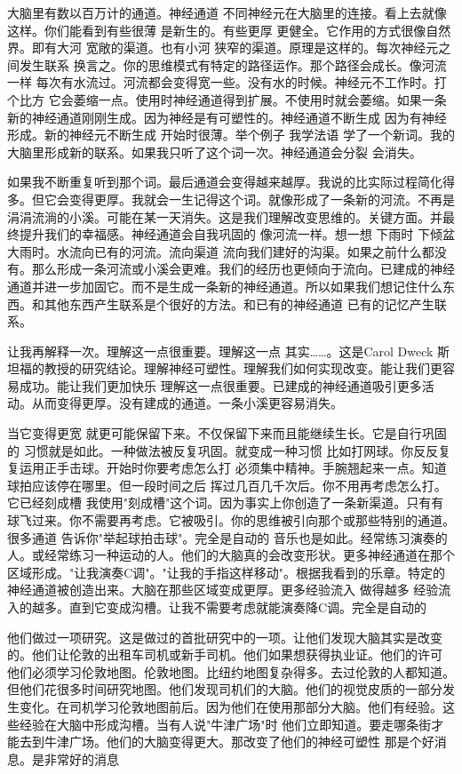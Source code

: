 大脑里有数以百万计的通道。神经通道 不同神经元在大脑里的连接。看上去就像这样。你们能看到有些很薄 是新生的。有些更厚 更健全。它作用的方式很像自然界。即有大河 宽敞的渠道。也有小河 狭窄的渠道。原理是这样的。每次神经元之间发生联系 换言之。你的思维模式有特定的路径运作。那个路径会成长。像河流一样 每次有水流过。河流都会变得宽一些。没有水的时候。神经元不工作时。打个比方 它会萎缩一点。使用时神经通道得到扩展。不使用时就会萎缩。如果一条新的神经通道刚刚生成。因为神经是有可塑性的。神经通道不断生成 因为有神经形成。新的神经元不断生成 开始时很薄。举个例子 我学法语 学了一个新词。我的大脑里形成新的联系。如果我只听了这个词一次。神经通道会分裂 会消失。 

如果我不断重复听到那个词。最后通道会变得越来越厚。我说的比实际过程简化得多。但它会变得更厚。我就会一生记得这个词。就像形成了一条新的河流。不再是涓涓流淌的小溪。可能在某一天消失。这是我们理解改变思维的。关键方面。并最终提升我们的幸福感。神经通道会自我巩固的 像河流一样。想一想 下雨时 下倾盆大雨时。水流向已有的河流。流向渠道 流向我们建好的沟渠。如果之前什么都没有。那么形成一条河流或小溪会更难。我们的经历也更倾向于流向。已建成的神经通道并进一步加固它。而不是生成一条新的神经通道。所以如果我们想记住什么东西。和其他东西产生联系是个很好的方法。和已有的神经通道 已有的记忆产生联系。 

让我再解释一次。理解这一点很重要。理解这一点 其实……。这是Carol Dweck 斯坦福的教授的研究结论。理解神经可塑性。理解我们如何实现改变。能让我们更容易成功。能让我们更加快乐 理解这一点很重要。已建成的神经通道吸引更多活动。从而变得更厚。没有建成的通道。一条小溪更容易消失。 

当它变得更宽 就更可能保留下来。不仅保留下来而且能继续生长。它是自行巩固的 习惯就是如此。一种做法被反复巩固。就变成一种习惯 比如打网球。你反反复复运用正手击球。开始时你要考虑怎么打 必须集中精神。手腕翘起来一点。知道球拍应该停在哪里。但一段时间之后 挥过几百几千次后。你不用再考虑怎么打。它已经刻成槽 我使用"刻成槽"这个词。因为事实上你创造了一条新渠道。只有有球飞过来。你不需要再考虑。它被吸引。你的思维被引向那个或那些特别的通道。很多通道 告诉你"举起球拍击球"。完全是自动的 音乐也是如此。经常练习演奏的人。或经常练习一种运动的人。他们的大脑真的会改变形状。更多神经通道在那个区域形成。"让我演奏C调"。"让我的手指这样移动"。根据我看到的乐章。特定的神经通道被创造出来。大脑在那些区域变成更厚。更多经验流入 做得越多 经验流入的越多。直到它变成沟槽。让我不需要考虑就能演奏降C调。完全是自动的 

他们做过一项研究。这是做过的首批研究中的一项。让他们发现大脑其实是改变的。他们让伦敦的出租车司机或新手司机。他们如果想获得执业证。他们的许可 他们必须学习伦敦地图。伦敦地图。比纽约地图复杂得多。去过伦敦的人都知道。但他们花很多时间研究地图。他们发现司机们的大脑。他们的视觉皮质的一部分发生变化。在司机学习伦敦地图前后。因为他们在使用那部分大脑。他们有经验。这些经验在大脑中形成沟槽。当有人说"牛津广场"时 他们立即知道。要走哪条街才能去到牛津广场。他们的大脑变得更大。那改变了他们的神经可塑性 那是个好消息。是非常好的消息 

